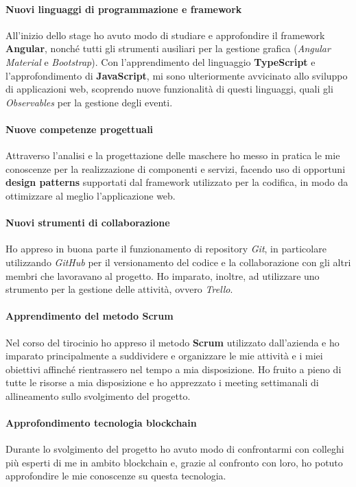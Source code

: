 \paragraph{\textbf{Nuovi linguaggi di programmazione e framework}}
All'inizio dello stage ho avuto modo di studiare e approfondire il framework \textbf{Angular}, nonché tutti gli strumenti ausiliari per la gestione grafica (\textit{Angular Material} e \textit{Bootstrap}). Con l'apprendimento del linguaggio \textbf{TypeScript} e l'approfondimento di \textbf{JavaScript}, mi sono ulteriormente avvicinato allo sviluppo di applicazioni web, scoprendo nuove funzionalità di questi linguaggi, quali gli \textit{Observables} per la gestione degli eventi.

\paragraph{\textbf{Nuove competenze progettuali}}
Attraverso l'analisi e la progettazione delle maschere ho messo in pratica le mie conoscenze per la realizzazione di componenti e servizi, facendo uso di opportuni \textbf{design patterns} supportati dal framework utilizzato per la codifica, in modo da ottimizzare al meglio l'applicazione web.

\paragraph{\textbf{Nuovi strumenti di collaborazione}}
Ho appreso in buona parte il funzionamento di repository \textit{Git}, in particolare utilizzando \textit{GitHub} per il versionamento del codice e la collaborazione con gli altri membri che lavoravano al progetto. Ho imparato, inoltre, ad utilizzare uno strumento per la gestione delle attività, ovvero \textit{Trello}.

\paragraph{\textbf{Apprendimento del metodo Scrum}}
Nel corso del tirocinio ho appreso il metodo \textbf{Scrum} utilizzato dall'azienda e ho imparato principalmente a suddividere e organizzare le mie attività e i miei obiettivi affinché rientrassero nel tempo a mia disposizione. Ho fruito a pieno di tutte le risorse a mia disposizione e ho apprezzato i meeting settimanali di allineamento sullo svolgimento del progetto.

\paragraph{\textbf{Approfondimento tecnologia blockchain}}
Durante lo svolgimento del progetto ho avuto modo di confrontarmi con colleghi più esperti di me in ambito blockchain e, grazie al confronto con loro, ho potuto approfondire le mie conoscenze su questa tecnologia.

